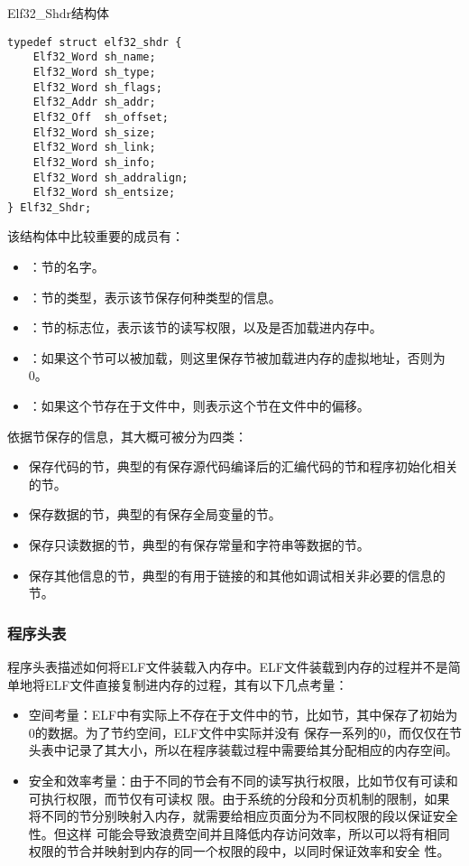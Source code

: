 \begin{listing}
\caption{Elf32\_Shdr结构体}
\label{LST-elf32-shdr}
\begin{verbatim}
typedef struct elf32_shdr {
    Elf32_Word sh_name;
    Elf32_Word sh_type;
    Elf32_Word sh_flags;
    Elf32_Addr sh_addr;
    Elf32_Off  sh_offset;
    Elf32_Word sh_size;
    Elf32_Word sh_link;
    Elf32_Word sh_info;
    Elf32_Word sh_addralign;
    Elf32_Word sh_entsize;
} Elf32_Shdr;
\end{verbatim}
\end{listing}

该结构体中比较重要的成员有：
\begin{itemize}
    \item {}：节的名字。
    \item {}：节的类型，表示该节保存何种类型的信息。
    \item {}：节的标志位，表示该节的读写权限，以及是否加载进内存中。
    \item {}：如果这个节可以被加载，则这里保存节被加载进内存的虚拟地址，否则为0。
    \item {}：如果这个节存在于文件中，则表示这个节在文件中的偏移。
\end{itemize}

依据节保存的信息，其大概可被分为四类：
\begin{itemize}
    \item 保存代码的节，典型的有保存源代码编译后的汇编代码的节和程序初始化相关的节。
    \item 保存数据的节，典型的有保存全局变量的节。
    \item 保存只读数据的节，典型的有保存常量和字符串等数据的节。
    \item 保存其他信息的节，典型的有用于链接的和其他如调试相关非必要的信息的节。
\end{itemize}

\subsubsection{程序头表}

程序头表描述如何将ELF文件装载入内存中。ELF文件装载到内存的过程并不是简单地将ELF文件直接复制进内存的过程，其有以下几点考量：
\begin{itemize}
    \item 空间考量：ELF中有实际上不存在于文件中的节，比如节，其中保存了初始为0的数据。为了节约空间，ELF文件中实际并没有
            保存一系列的0，而仅仅在节头表中记录了其大小，所以在程序装载过程中需要给其分配相应的内存空间。
    \item 安全和效率考量：由于不同的节会有不同的读写执行权限，比如节仅有可读和可执行权限，而节仅有可读权
            限。由于系统的分段和分页机制的限制，如果将不同的节分别映射入内存，就需要给相应页面分为不同权限的段以保证安全性。但这样
            可能会导致浪费空间并且降低内存访问效率，所以可以将有相同权限的节合并映射到内存的同一个权限的段中，以同时保证效率和安全
            性。
\end{itemize}

